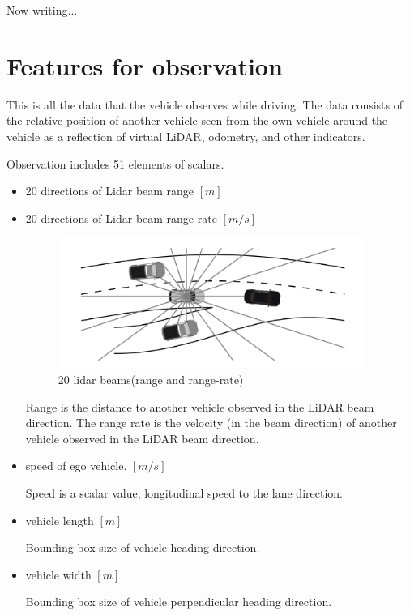 Now writing...


\section{Features for observation}

This is all the data that the vehicle observes while driving. The data consists of the relative position of another vehicle seen from the own vehicle around the vehicle as a reflection of virtual LiDAR, odometry, and other indicators.

Observation includes 51 elements of scalars.

\begin{itemize}
\item 20 directions of Lidar beam range $[m]$
\item 20 directions of Lidar beam range rate $[m/s]$

\begin{figure}[H]
\begin{center}
\includegraphics[width=10cm]{./figures/lidar_beam.png}
\caption{20 lidar beams(range and range-rate)}
\label{fig:lidar_beam}
\end{center}
\end{figure}

Range is the distance to another vehicle observed in the LiDAR beam direction.
The range rate is the velocity (in the beam direction) of another vehicle observed in the LiDAR beam direction.

\item speed of ego vehicle. $[m/s]$

Speed is a scalar value, longitudinal speed to the lane direction.

\item vehicle length $[m]$

Bounding box size of vehicle heading direction.

\item vehicle width $[m]$

Bounding box size of vehicle perpendicular heading direction.


\end{itemize}
